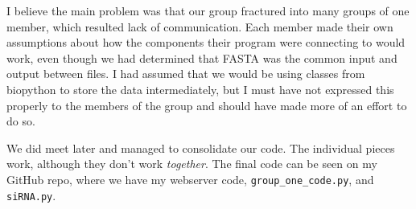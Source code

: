 \documentclass[10pt,letterpaper]{article}
\begin{document}
I believe the main problem was that our group fractured into many groups of one member, which resulted lack of communication.
Each member made their own assumptions about how the components their program were connecting to would work, even though we had determined that FASTA was the common input and output between files.
I had assumed that we would be using classes from biopython to store the data intermediately, but I must have not expressed this properly to the members of the group and should have made more of an effort to do so.

We did meet later and managed to consolidate our code.  
The individual pieces work, although they don't work \textit{together}.
The final code can be seen on my GitHub repo, where we have my webserver code, \texttt{group\_one\_code.py}, and \texttt{siRNA.py}.



\end{document}
